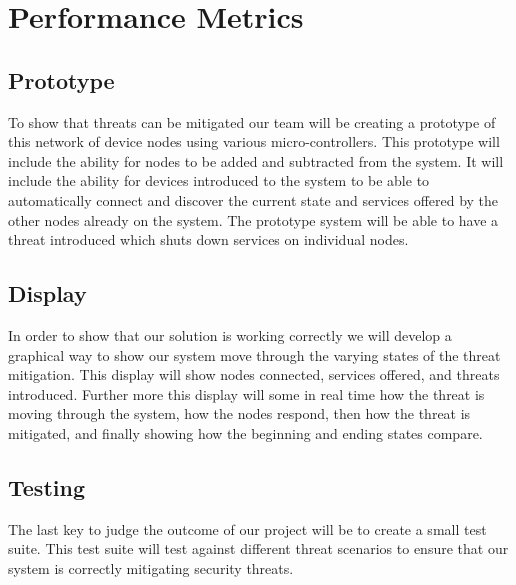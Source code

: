 \documentclass[onecolumn, draftclsnofoot,10pt, compsoc]{IEEEtran}
\begin{document}
\section*{Performance Metrics}
\subsection*{Prototype}
To show that threats can be mitigated our team will be creating a prototype of this network of device nodes using various micro-controllers. This prototype will include the ability for nodes to be added and subtracted from the system. It will include the ability for devices introduced to the system to be able to automatically connect and discover the current state and services offered by the other nodes already on the system. The prototype system will be able to have a threat introduced which shuts down services on individual nodes. 
\subsection*{Display}
In order to show that our solution is working correctly we will develop a graphical way to show our system move through the varying states of the threat mitigation. This display will show nodes connected, services offered, and threats introduced. Further more this display will some in real time how the threat is moving through the system, how the nodes respond, then how the threat is mitigated, and finally showing how the beginning and ending states compare.
\subsection*{Testing}
The last key to judge the outcome of our project will be to create a small test suite. This test suite will test against different threat scenarios to ensure that our system is correctly mitigating security threats. 



\vspace{2 in}
\end{document}
